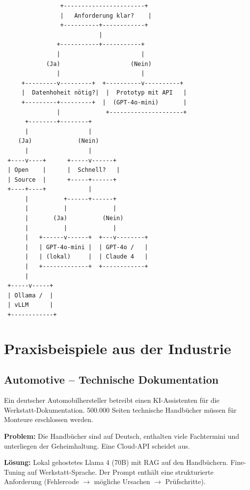 \begin{verbatim}
                +-----------------------+
                |   Anforderung klar?    |
                +----------+------------+
                           |
               +-----------+-----------+
               |                       |
            (Ja)                    (Nein)
               |                       |
     +---------v---------+  +----------v----------+
     |  Datenhoheit nötig?|  |  Prototyp mit API   |
     +---------+---------+  |  (GPT-4o-mini)       |
               |             +---------------------+
      +--------+--------+
      |                 |
    (Ja)             (Nein)
      |                 |
 +----v----+      +-----v------+
 | Open    |      |  Schnell?   |
 | Source  |      +-----+------+
 +----+----+            |
      |          +------+------+
      |          |             |
      |       (Ja)          (Nein)
      |          |             |
      |   +------v------+  +---v--------+
      |   | GPT-4o-mini |  | GPT-4o /   |
      |   | (lokal)     |  | Claude 4   |
      |   +-------------+  +------------+
      |
 +-----v-----+
 | Ollama /  |
 | vLLM      |
 +------------+
\end{verbatim}

\section{Praxisbeispiele aus der Industrie}

\subsection{Automotive -- Technische Dokumentation}

Ein deutscher Automobilhersteller betreibt einen KI-Assistenten für die Werkstatt-Dokumentation. 500.000 Seiten technische Handbücher müssen für Monteure erschlossen werden.

\textbf{Problem:} Die Handbücher sind auf Deutsch, enthalten viele Fachtermini und unterliegen der Geheimhaltung. Eine Cloud-API scheidet aus.

\textbf{Lösung:} Lokal gehostetes Llama 4 (70B) mit RAG auf den Handbüchern. Fine-Tuning auf Werkstatt-Sprache. Der Prompt enthält eine strukturierte Anforderung (Fehlercode $\rightarrow$ mögliche Ursachen $\rightarrow$ Prüfschritte).

